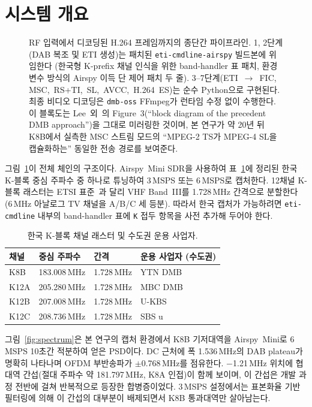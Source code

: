 \documentclass[11pt,a4paper]{article}
\begin{document}
\section{시스템 개요}\label{sec:system}

\begin{figure}[t]
\centering

\caption{RF 입력에서 디코딩된 H.264 프레임까지의 종단간 파이프라인.
1, 2단계(DAB 복조 및 ETI 생성)는 패치된 \texttt{eti-cmdline-airspy} 빌드본에
위임한다 (한국형 K-prefix 채널 인식을 위한 band-handler 표 패치, 환경변수
방식의 Airspy 이득 단 제어 패치 두 줄).  3--7단계(ETI~$\to$~FIC,
MSC,~RS+TI,~SL,~AVCC,~H.264~ES)는 순수 Python으로 구현된다.  최종 비디오
디코딩은 \texttt{dmb-oss} FFmpeg가 런타임 수정 없이 수행한다.  이 블록도는
Lee~외~\cite{lee2004m4smux}의 Figure~3(``block diagram of the precedent DMB
approach'')을 그대로 미러링한 것이며, 본 연구가 약 20년 뒤 K8B에서 실측한
MSC 스트림 모드의 ``MPEG-2 TS가 MPEG-4 SL을 캡슐화하는'' 동일한 전송 경로를
보여준다.}
\label{fig:pipeline}
\end{figure}

그림~\ref{fig:pipeline}이 전체 체인의 구조이다.  Airspy~Mini SDR을 사용하여
표~\ref{tab:k-block}에 정리된 한국 K-블록 중심 주파수 중 하나로 튜닝하여
3\,MSPS 또는 6\,MSPS로 캡처한다.  12채널 K-블록 래스터는 ETSI
표준~\cite{etsi300401}과 달리 VHF Band~III를 1.728\,MHz 간격으로 분할한다
(6\,MHz 아날로그 TV 채널을 A/B/C 세 등분).  따라서 한국 캡처가 가능하려면
\texttt{eti-cmdline} 내부의 band-handler 표에 \texttt{K} 접두 항목을
사전 추가해 두어야 한다.

\begin{table}[t]
\centering
\caption{한국 K-블록 채널 래스터 및 수도권 운용 사업자.}
\label{tab:k-block}
\begin{tabular}{llll}
\toprule
채널 & 중심 주파수 & 간격 & 운용 사업자 (수도권) \\
\midrule
K8B  & 183.008\,MHz & 1.728\,MHz & YTN DMB \\
K12A & 205.280\,MHz & 1.728\,MHz & MBC DMB \\
K12B & 207.008\,MHz & 1.728\,MHz & U-KBS \\
K12C & 208.736\,MHz & 1.728\,MHz & SBS u \\
\bottomrule
\end{tabular}
\end{table}

그림~\ref{fig:spectrum}은 본 연구의 캡처 환경에서 K8B 기저대역을
Airspy~Mini로 6\,MSPS 10초간 적분하여 얻은 PSD이다.  DC 근처에
폭 1.536\,MHz의 DAB plateau가 명확히 나타나며 OFDM 부반송파가
$\pm$0.768\,MHz를 점유한다.  $-$1.21\,MHz 위치에 협대역 간섭(절대
주파수 약 181.797\,MHz, K8A 인접)이 함께 보이며, 이 간섭은
개발 과정 전반에 걸쳐 반복적으로 등장한 합병증이었다.  3\,MSPS
설정에서는 표본화율 기반 필터링에 의해 이 간섭의 대부분이
배제되면서 K8B 통과대역만 살아남는다.
\end{document}
